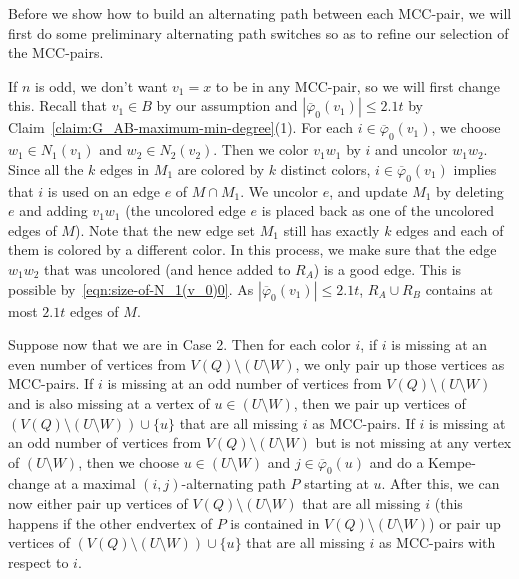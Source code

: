 \documentclass[11pt, oneside]{article}
\newcommand{\pbar}{\overline{\varphi}}
\begin{document}
Before we show how to build an alternating path between each MCC-pair, we will first do some preliminary alternating path switches so as to refine our selection of the MCC-pairs. 

If $n$ is odd, we don't want $v_1=x$ to be in any MCC-pair, so we will first change this.  Recall that $v_1 \in B$ by our assumption 
and $|\pbar_0(v_1)|\le 2.1 t$ by Claim~\ref{claim:G_AB-maximum-min-degree}(1). 
For each $i\in \pbar_0(v_1)$, we choose $w_1\in N_1(v_1)$ and $w_2\in N_2(v_2)$. 
Then we color $v_1w_1$ by $i$ and uncolor $w_1w_2$.  Since all the $k$ edges in $M_1$ are colored by $k$ distinct colors, 
$i\in \pbar_0(v_1)$ implies that $i$ is used on an edge $e$ of $M\cap M_1$.  We uncolor $e$, and update $M_1$ by deleting $e$
and adding $v_1w_1$ (the uncolored edge $e$ is placed back as one of the uncolored edges of $M$). Note that the new edge set $M_1$ still has exactly $k$ edges and each of them is colored by a different color. 
In this process, we make sure that the edge $w_1w_2$ that was  uncolored  (and hence added to 
$R_A$) is a good edge. This is possible by~\eqref{eqn:size-of-N_1(v_0)0}.  As $|\pbar_0(v_1)|\le 2.1 t$,  $R_A\cup R_B$
contains at most $2.1t$ edges of $M$. 

Suppose now that we are in  Case 2. Then for each color $i$, if $i$ is missing at an even number of 
vertices from $V(Q)\setminus (U\setminus W)$, we only pair up those vertices as MCC-pairs. If $i$ is missing at an odd  number of 
vertices from $V(Q)\setminus (U\setminus W)$ and is also missing at a vertex of $u\in (U\setminus W)$, then  
we pair up vertices of $(V(Q)\setminus (U\setminus W)) \cup \{u\}$ that are all missing $i$ as MCC-pairs. If $i$ is missing at an odd  number of 
vertices from $V(Q)\setminus (U\setminus W)$ but is not missing at any vertex of $(U\setminus W)$, then we choose $u\in (U\setminus W)$ and $j\in \pbar_0(u)$ and do a Kempe-change at a maximal $(i,j)$-alternating path $P$ starting at $u$. After this, we can now either pair up vertices of $V(Q)\setminus (U\setminus W)$
that are all missing $i$ (this happens if the other endvertex of $P$ is contained in $V(Q)\setminus (U\setminus W)$) or pair up vertices of $(V(Q)\setminus (U\setminus W)) \cup \{u\}$ that are all missing $i$ as MCC-pairs with respect to $i$.  
\end{document}
